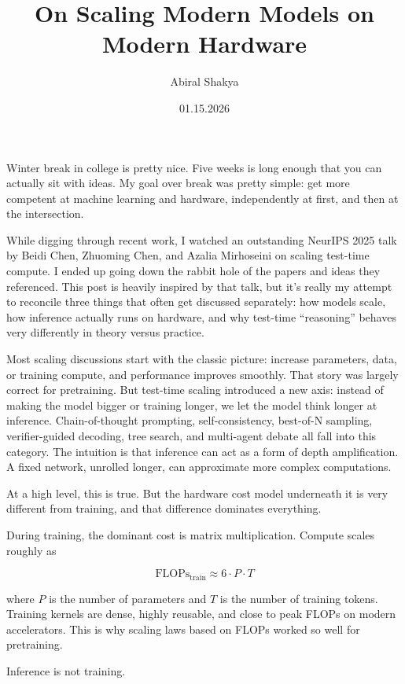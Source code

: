 \documentclass[12pt]{article}
\title{On Scaling Modern Models on Modern Hardware}
\author{Abiral Shakya}
\date{01.15.2026}
\begin{document}
\maketitle

Winter break in college is pretty nice. Five weeks is long enough that you can actually sit with ideas. My goal over break was pretty simple: get more competent at machine learning and hardware, independently at first, and then at the intersection.

While digging through recent work, I watched an outstanding NeurIPS 2025 talk by Beidi Chen, Zhuoming Chen, and Azalia Mirhoseini on scaling test-time compute. I ended up going down the rabbit hole of the papers and ideas they referenced. This post is heavily inspired by that talk, but it's really my attempt to reconcile three things that often get discussed separately: how models scale, how inference actually runs on hardware, and why test-time ``reasoning'' behaves very differently in theory versus practice.

Most scaling discussions start with the classic picture: increase parameters, data, or training compute, and performance improves smoothly. That story was largely correct for pretraining. But test-time scaling introduced a new axis: instead of making the model bigger or training longer, we let the model think longer at inference. Chain-of-thought prompting, self-consistency, best-of-N sampling, verifier-guided decoding, tree search, and multi-agent debate all fall into this category. The intuition is that inference can act as a form of depth amplification. A fixed network, unrolled longer, can approximate more complex computations.

At a high level, this is true. But the hardware cost model underneath it is very different from training, and that difference dominates everything.

During training, the dominant cost is matrix multiplication. Compute scales roughly as

\begin{equation}
\text{FLOPs}_\text{train} \approx 6 \cdot P \cdot T
\end{equation}

where $P$ is the number of parameters and $T$ is the number of training tokens. Training kernels are dense, highly reusable, and close to peak FLOPs on modern accelerators. This is why scaling laws based on FLOPs worked so well for pretraining.

Inference is not training.
\end{document}
